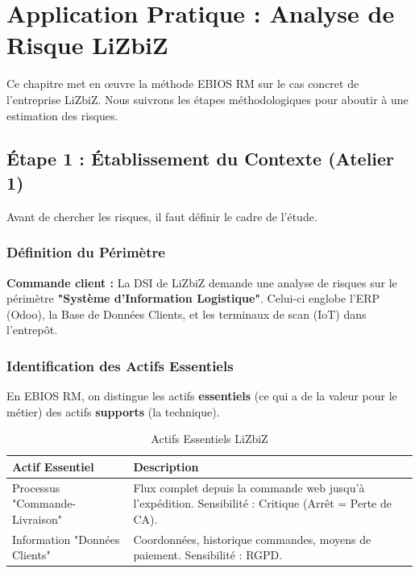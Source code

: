 \chapter{Application Pratique : Analyse de Risque LiZbiZ}
\label{chap:apprisque}

Ce chapitre met en œuvre la méthode EBIOS RM sur le cas concret de l'entreprise LiZbiZ. Nous suivrons les étapes méthodologiques pour aboutir à une estimation des risques.

\section{Étape 1 : Établissement du Contexte (Atelier 1)}

Avant de chercher les risques, il faut définir le cadre de l'étude.

\subsection{Définition du Périmètre}

\begin{boxlizbiz}
\textbf{Commande client :} La DSI de LiZbiZ demande une analyse de risques sur le périmètre \textbf{"Système d'Information Logistique"}.
Celui-ci englobe l'ERP (Odoo), la Base de Données Clients, et les terminaux de scan (IoT) dans l'entrepôt.
\end{boxlizbiz}

\subsection{Identification des Actifs Essentiels}

En EBIOS RM, on distingue les actifs \textbf{essentiels} (ce qui a de la valeur pour le métier) des actifs \textbf{supports} (la technique).

\begin{table}[htbp]
\centering
\begin{tabular}{p{4cm}p{7cm}}
    \toprule
    \textbf{Actif Essentiel} & \textbf{Description} \\
    \midrule
    Processus "Commande-Livraison" & Flux complet depuis la commande web jusqu'à l'expédition. Sensibilité : Critique (Arrêt = Perte de CA). \\
    Information "Données Clients" & Coordonnées, historique commandes, moyens de paiement. Sensibilité : RGPD. \\
    \bottomrule
\end{tabular}
\caption{Actifs Essentiels LiZbiZ}
\end{table}

